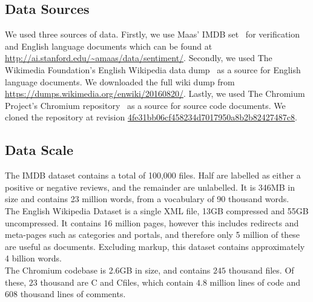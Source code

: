 \documentclass[11pt]{article}
\newcommand{\CPP}
{C\nolinebreak[4]\hspace{-.05em}\raisebox{.22ex}{\footnotesize\bf ++\ }}
\begin{document}
\subsection*{Data Sources}
We used three sources of data. Firstly, we use Maas' IMDB set~\cite{maas2011}
for verification and English language documents which can be found at
\url{http://ai.stanford.edu/~amaas/data/sentiment/}. Secondly, we used The
Wikimedia Foundation's English Wikipedia data dump~\cite{wikidatadump2016} as
a source for English language documents. We downloaded the full wiki dump from
\url{https://dumps.wikimedia.org/enwiki/20160820/}. Lastly, we used The
Chromium Project's Chromium repository~\cite{chromium2016} as a source for
source code documents. We cloned the repository at revision
\href{https://github.com/nwjs/chromium.src/commit/4fe31bb06cf458234d7017950a8b2b82427487c8}
{4fe31bb06cf458234d7017950a8b2b82427487c8}.

\subsection*{Data Scale}
The IMDB dataset contains a total of 100,000 files. Half are labelled as either a
positive or negative reviews, and the remainder are unlabelled. It is 346MB in size
and contains 23 million words, from a vocabulary of 90 thousand words.\\
The English Wikipedia Dataset is a single XML file, 13GB compressed and
55GB uncompressed. It contains 16 million pages, however this includes
redirects and meta-pages such as categories and portals, and therefore only
5 million of these are useful as documents. Excluding markup, this dataset contains
approximately 4 billion words.\\
The Chromium codebase is 2.6GB in size, and contains $245$ thousand files.
Of these, $23$ thousand are C and \CPP files, which contain $4.8$ million lines of
code and $608$ thousand lines of comments.
\end{document}
